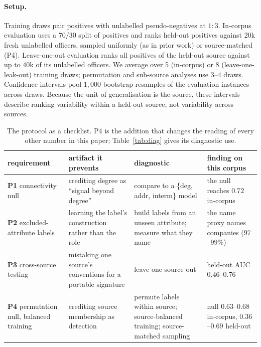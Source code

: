 \documentclass[11pt]{article}
\begin{document}
\paragraph{Setup.} Training draws pair positives with unlabelled pseudo-negatives
at $1{:}3$. In-corpus evaluation uses a $70/30$ split of positives and ranks held-out
positives against $20$k fresh unlabelled officers, sampled uniformly (as in prior
work) or source-matched (P4). Leave-one-out evaluation ranks all positives of the
held-out source against up to $40$k of its unlabelled officers. We average over 5
(in-corpus) or 8 (leave-one-leak-out) training draws; permutation and sub-source
analyses use 3--4 draws. Confidence intervals pool $1{,}000$ bootstrap resamples of
the evaluation instances across draws. Because the unit of generalisation is the
source, these intervals describe ranking variability within a held-out source, not
variability across sources.

\begin{table}[t]\centering\small
\setlength{\tabcolsep}{5pt}\renewcommand{\arraystretch}{1.15}
\begin{tabular}{>{\raggedright\arraybackslash}p{2.3cm}>{\raggedright\arraybackslash}p{3.6cm}>{\raggedright\arraybackslash}p{4.4cm}>{\raggedright\arraybackslash}p{3.7cm}}
\toprule
requirement & artifact it prevents & diagnostic & finding on this corpus\\
\midrule
\textbf{P1} connectivity null & crediting degree as ``signal beyond degree'' & compare to a \{deg, addr, interm\} model & the null reaches $0.72$ in-corpus\\
\textbf{P2} excluded-attribute labels & learning the label's construction rather than the role & build labels from an unseen attribute; measure what they name & the name proxy names companies ($97$--$99\%$)\\
\textbf{P3} cross-source testing & mistaking one source's conventions for a portable signature & leave one source out & held-out AUC $0.46$--$0.76$\\
\textbf{P4} permutation null, balanced training & crediting source membership as detection & permute labels within source; source-balanced training; source-matched sampling & null $0.63$--$0.68$ in-corpus, $0.36$--$0.69$ held-out\\
\bottomrule
\end{tabular}
\caption{The protocol as a checklist. P4 is the addition that changes the reading
of every other number in this paper; Table~\ref{tab:diag} gives its diagnostic use.}\label{tab:protocol}\end{table}
\end{document}

